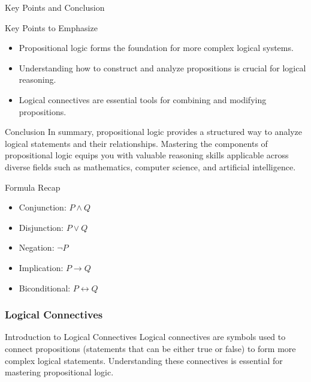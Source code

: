 \documentclass[aspectratio=169]{beamer}
\begin{document}
\begin{frame}[fragile]{Key Points and Conclusion}
    \begin{block}{Key Points to Emphasize}
        \begin{itemize}
            \item Propositional logic forms the foundation for more complex logical systems.
            \item Understanding how to construct and analyze propositions is crucial for logical reasoning.
            \item Logical connectives are essential tools for combining and modifying propositions.
        \end{itemize}
    \end{block}
    
    \begin{block}{Conclusion}
        In summary, propositional logic provides a structured way to analyze logical statements and their relationships. 
        Mastering the components of propositional logic equips you with valuable reasoning skills applicable across diverse fields such as mathematics, computer science, and artificial intelligence.
    \end{block}

    \begin{block}{Formula Recap}
        \begin{itemize}
            \item Conjunction: $P \land Q$
            \item Disjunction: $P \lor Q$
            \item Negation: $\neg P$
            \item Implication: $P \rightarrow Q$
            \item Biconditional: $P \leftrightarrow Q$
        \end{itemize}
    \end{block}
\end{frame}

\begin{frame}[fragile]
    \frametitle{Logical Connectives}
    \begin{block}{Introduction to Logical Connectives}
        Logical connectives are symbols used to connect propositions (statements that can be either true or false) to form more complex logical statements. Understanding these connectives is essential for mastering propositional logic.
    \end{block}
\end{frame}
\end{document}
